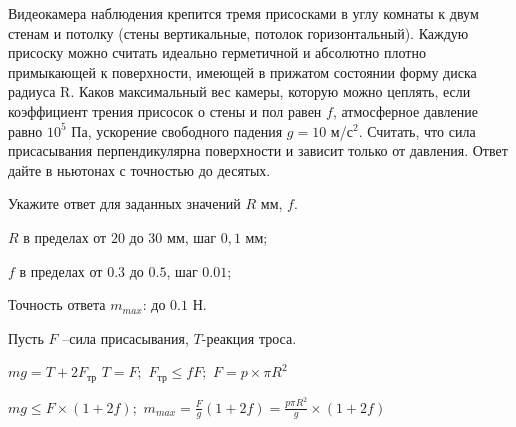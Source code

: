 
Видеокамера наблюдения крепится тремя присосками в углу
комнаты к двум стенам и потолку (стены вертикальные, потолок горизонтальный). Каждую
присоску можно считать идеально герметичной и абсолютно плотно примыкающей к поверхности,
имеющей в прижатом состоянии форму диска радиуса R. Каков
максимальный вес камеры, которую можно цеплять, если коэффициент трения
присосок о стены и пол равен $f$, атмосферное
давление равно $10^5$ Па, ускорение свободного падения $g = 10$ м/с$^2$. Считать, что
сила присасывания перпендикулярна поверхности и зависит только от давления. Ответ дайте в ньютонах с точностью до десятых.

Укажите ответ для заданных значений $R$ мм, $f$.

\paramSection

$R$  в пределах от $20$ до $30$ мм, шаг $0,1$ мм;

$f$ в пределах от $0.3$ до $0.5$, шаг $0.01$;

Точность ответа $m_{max}$: до $0.1$ Н.

\solutionSection

Пусть $F$ –сила присасывания, $T$-реакция троса.

$mg=T+2F_{\text{тр}}$     $T=F;$     $ F_{\text{тр}} \leq fF;$   $F=p \times \pi R^2$  

$mg \leq F \times (1+2f);$     $m_{max}=\frac{F}{g}(1+2f)=\frac{p\pi R^2}{g} \times (1+2f)$

